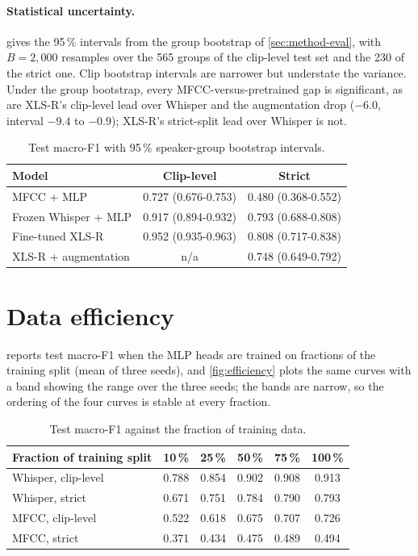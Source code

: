 \paragraph{Statistical uncertainty.}  gives the 95\,\%
intervals from the group bootstrap of \cref{sec:method-eval}, with $B =
2{,}000$ resamples over the 565 groups of the clip-level test set and the 230
of the strict one. Clip bootstrap intervals are narrower but understate the
variance. Under the group bootstrap, every MFCC-versus-pretrained gap is
significant, as are XLS-R's clip-level lead over Whisper and the augmentation
drop ($-6.0$, interval $-9.4$ to $-0.9$); XLS-R's strict-split lead over
Whisper is not.

\begin{table}[ht]
  \centering
  \caption{Test macro-F1 with 95\,\% speaker-group bootstrap intervals.}
  \label{tab:ci-acoustic}
  \begin{tabular}{lcc}
    \toprule
    Model & Clip-level & Strict \\
    \midrule
    MFCC + MLP             & 0.727 (0.676-0.753) & 0.480 (0.368-0.552) \\
    Frozen Whisper + MLP   & 0.917 (0.894-0.932) & 0.793 (0.688-0.808) \\
    Fine-tuned XLS-R       & 0.952 (0.935-0.963) & 0.808 (0.717-0.838) \\
    XLS-R + augmentation   & n/a                  & 0.748 (0.649-0.792) \\
    \bottomrule
  \end{tabular}
\end{table}

\section{Data efficiency}
\label{sec:res-efficiency}

 reports test macro-F1 when the MLP heads are trained on
fractions of the training split (mean of three seeds), and
\cref{fig:efficiency} plots the same curves with a band showing the range over
the three seeds; the bands are narrow, so the ordering of the four curves is
stable at every fraction.

\begin{table}[ht]
  \centering
  \caption{Test macro-F1 against the fraction of training data.}
  \label{tab:efficiency}
  \begin{tabular}{lccccc}
    \toprule
    Fraction of training split & 10\,\% & 25\,\% & 50\,\% & 75\,\% & 100\,\% \\
    \midrule
    Whisper, clip-level & 0.788 & 0.854 & 0.902 & 0.908 & 0.913 \\
    Whisper, strict     & 0.671 & 0.751 & 0.784 & 0.790 & 0.793 \\
    MFCC, clip-level    & 0.522 & 0.618 & 0.675 & 0.707 & 0.726 \\
    MFCC, strict        & 0.371 & 0.434 & 0.475 & 0.489 & 0.494 \\
    \bottomrule
  \end{tabular}
\end{table}

